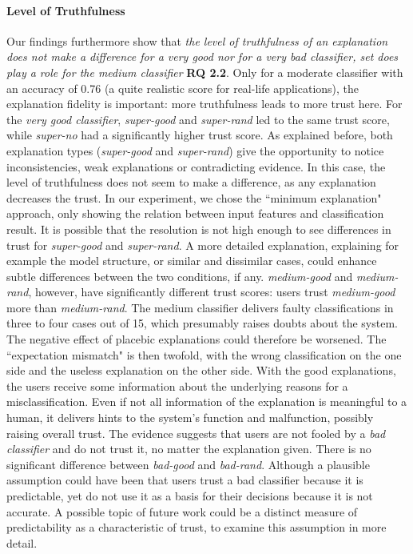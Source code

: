 \paragraph{Level of Truthfulness} 
Our findings furthermore show that \textit{the level of truthfulness of an explanation does not make a difference for a very good nor for a very bad classifier, set does play a role for the medium classifier} \textbf{RQ 2.2}. Only for a moderate classifier with an accuracy of 0.76 (a quite realistic score for real-life applications), the explanation fidelity is important: more truthfulness leads to more trust here.\newline
For the \textit{very good classifier}, \textit{super-good} and \textit{super-rand} led to the same trust score, while \textit{super-no} had a significantly higher trust score. As explained before, both explanation types (\textit{super-good} and \textit{super-rand}) give the opportunity to notice inconsistencies, weak explanations or contradicting evidence. In this case, the level of truthfulness does not seem to make a difference, as any explanation decreases the trust. In our experiment, we chose the ``minimum explanation" approach, only showing the relation between input features and classification result. It is possible that the resolution is not high enough to see differences in trust for \textit{super-good} and \textit{super-rand}. A more detailed explanation, explaining for example the model structure, or similar and dissimilar cases, could enhance subtle differences between the two conditions, if any.\newline
\textit{medium-good} and \textit{medium-rand}, however, have significantly different trust scores: users trust \textit{medium-good} more than \textit{medium-rand}. The medium classifier delivers faulty classifications in three to four cases out of 15, which presumably raises doubts about the system. The negative effect of placebic explanations could therefore be worsened. The ``expectation mismatch" is then twofold, with the wrong classification on the one side and the useless explanation on the other side. With the good explanations, the users receive some information about the underlying reasons for a misclassification. Even if not all information of the explanation is meaningful to a human, it delivers hints to the system's function and malfunction, possibly raising overall trust.\newline
The evidence suggests that users are not fooled by a \textit{bad classifier} and do not trust it, no matter the explanation given. There is no significant difference between \textit{bad-good} and \textit{bad-rand}. Although a plausible assumption could have been that users trust a bad classifier because it is predictable, yet do not use it as a basis for their decisions because it is not accurate. A possible topic of future work could be a distinct measure of predictability as a characteristic of trust, to examine this assumption in more detail.\newline
